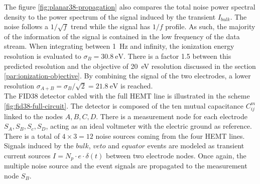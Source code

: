The figure \ref{fig:planar38-propagation} also compares the total noise power spectral density to the power spectrum of the signal induced by the transient $I_{bulk}$. The noise follows a $1/\sqrt{f}$ trend while the signal has $1/f$ profile. As such, the majority of the information of the signal is contained in the low frequency of the data stream. When integrating between \SI{1}{\Hz} and infinity, the ionization energy resolution is evaluated to $\sigma_B=\SI{30.8}{\eV}$. There is a factor 1.5 between this predicted resolution and the objective of \SI{20}{\eV} resolution discussed in the section \ref{par:ionization-objective}. By combining the signal of the two electrodes, a lower resolution $\sigma_{A+B} = \sigma_B / \sqrt{2} = \SI{21.8}{\eV}$ is reached. 
\\

The FID38 detector cabled with the full HEMT line is illustrated in the scheme \ref{fig:fid38-full-circuit}. The detector is composed of the ten mutual capacitance $C_{ij}^m$ linked to the nodes $A,B,C,D$. There is a measurement node for each electrode $S_A, S_B, S_c, S_D$, acting as an ideal voltmeter with the electric ground as reference. There is a total of $4\times3=12$ noise sources coming from the four HEMT lines. Signals induced by the $bulk$, $veto$ and $equator$ events are modeled as transient current sources $I=N_p \cdot e \cdot \delta(t)$ between two electrode nodes. Once again, the multiple noise source and the event signals are propagated to the measurement node $S_B$.


